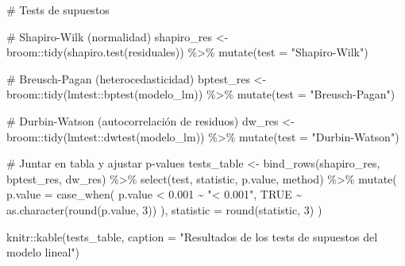 \documentclass[
  spanish,
  11pt,
  a4paper,
  DIV=11,
  numbers=noendperiod]{scrartcl}
\newenvironment{Shaded}{\begin{snugshade}}{\end{snugshade}}
\newcommand{\AttributeTok}[1]{\textcolor[rgb]{0.40,0.45,0.13}{#1}}
\newcommand{\CommentTok}[1]{\textcolor[rgb]{0.37,0.37,0.37}{#1}}
\newcommand{\ConstantTok}[1]{\textcolor[rgb]{0.56,0.35,0.01}{#1}}
\newcommand{\DecValTok}[1]{\textcolor[rgb]{0.68,0.00,0.00}{#1}}
\newcommand{\FloatTok}[1]{\textcolor[rgb]{0.68,0.00,0.00}{#1}}
\newcommand{\FunctionTok}[1]{\textcolor[rgb]{0.28,0.35,0.67}{#1}}
\newcommand{\NormalTok}[1]{\textcolor[rgb]{0.00,0.23,0.31}{#1}}
\newcommand{\OtherTok}[1]{\textcolor[rgb]{0.00,0.23,0.31}{#1}}
\newcommand{\SpecialCharTok}[1]{\textcolor[rgb]{0.37,0.37,0.37}{#1}}
\newcommand{\StringTok}[1]{\textcolor[rgb]{0.13,0.47,0.30}{#1}}
\begin{document}
\begin{Shaded}
\begin{Highlighting}[numbers=left,,]
\CommentTok{\# Tests de supuestos}

\CommentTok{\# Shapiro{-}Wilk (normalidad)}
\NormalTok{shapiro\_res }\OtherTok{\textless{}{-}}\NormalTok{ broom}\SpecialCharTok{::}\FunctionTok{tidy}\NormalTok{(}\FunctionTok{shapiro.test}\NormalTok{(residuales)) }\SpecialCharTok{\%\textgreater{}\%}
  \FunctionTok{mutate}\NormalTok{(}\AttributeTok{test =} \StringTok{"Shapiro{-}Wilk"}\NormalTok{)}

\CommentTok{\# Breusch{-}Pagan (heterocedasticidad)}
\NormalTok{bptest\_res }\OtherTok{\textless{}{-}}\NormalTok{ broom}\SpecialCharTok{::}\FunctionTok{tidy}\NormalTok{(lmtest}\SpecialCharTok{::}\FunctionTok{bptest}\NormalTok{(modelo\_lm)) }\SpecialCharTok{\%\textgreater{}\%}
  \FunctionTok{mutate}\NormalTok{(}\AttributeTok{test =} \StringTok{"Breusch{-}Pagan"}\NormalTok{)}

\CommentTok{\# Durbin{-}Watson (autocorrelación de residuos)}
\NormalTok{dw\_res }\OtherTok{\textless{}{-}}\NormalTok{ broom}\SpecialCharTok{::}\FunctionTok{tidy}\NormalTok{(lmtest}\SpecialCharTok{::}\FunctionTok{dwtest}\NormalTok{(modelo\_lm)) }\SpecialCharTok{\%\textgreater{}\%}
  \FunctionTok{mutate}\NormalTok{(}\AttributeTok{test =} \StringTok{"Durbin{-}Watson"}\NormalTok{)}

\CommentTok{\# Juntar en tabla y ajustar p{-}values}
\NormalTok{tests\_table }\OtherTok{\textless{}{-}} \FunctionTok{bind\_rows}\NormalTok{(shapiro\_res, bptest\_res, dw\_res) }\SpecialCharTok{\%\textgreater{}\%}
  \FunctionTok{select}\NormalTok{(test, statistic, p.value, method) }\SpecialCharTok{\%\textgreater{}\%}
  \FunctionTok{mutate}\NormalTok{(}
    \AttributeTok{p.value =} \FunctionTok{case\_when}\NormalTok{(}
\NormalTok{      p.value }\SpecialCharTok{\textless{}} \FloatTok{0.001} \SpecialCharTok{\textasciitilde{}} \StringTok{"\textless{} 0.001"}\NormalTok{,}
      \ConstantTok{TRUE} \SpecialCharTok{\textasciitilde{}} \FunctionTok{as.character}\NormalTok{(}\FunctionTok{round}\NormalTok{(p.value, }\DecValTok{3}\NormalTok{))}
\NormalTok{    ),}
    \AttributeTok{statistic =} \FunctionTok{round}\NormalTok{(statistic, }\DecValTok{3}\NormalTok{)}
\NormalTok{  )}

\NormalTok{knitr}\SpecialCharTok{::}\FunctionTok{kable}\NormalTok{(tests\_table, }\AttributeTok{caption =} \StringTok{"Resultados de los tests }
\StringTok{             de supuestos del modelo lineal"}\NormalTok{)}
\end{Highlighting}
\end{Shaded}
\end{document}
